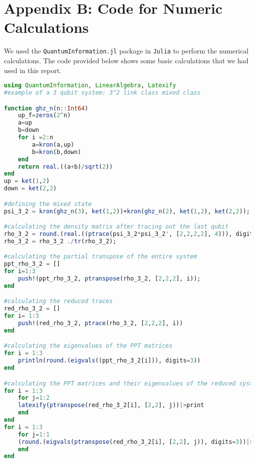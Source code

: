 \documentclass{scrartcl}
\begin{document}
\section*{Appendix B: {\huge Code for Numeric Calculations}}
We used the \texttt{QuantumInformation.jl} package in \texttt{Julia} to perform the numerical calculations. The code provided below shows some basic calculations that we had used in this report. 
\begin{lstlisting}[language=Julia,label={lst:transmission}]
using QuantumInformation, LinearAlgebra, Latexify 
#example of a 3 qubit system: 3^2 link class mixed class

function ghz_n(n::Int64)
    up_f=zeros(2^n)
    a=up
    b=down
    for i =2:n 
        a=kron(a,up)
        b=kron(b,down)
    end
    return real.((a+b)/sqrt(2))
end
up = ket(1,2)
down = ket(2,2)

#defining the mixed state 
psi_3_2 = kron(ghz_n(3), ket(1,2))+kron(ghz_n(2), ket(1,2), ket(2,2));

#calculating the density matrix after tracing out the last qubit
rho_3_2 = round.(real.((ptrace(psi_3_2*psi_3_2', [2,2,2,2], 4))), digits=3) 
rho_3_2 = rho_3_2 ./tr(rho_3_2);

#calculating the partial transpose of the entire system
ppt_rho_3_2 = []
for i=1:3
    push!(ppt_rho_3_2, ptranspose(rho_3_2, [2,2,2], i));
end

#calculating the reduced traces 
red_rho_3_2 = []
for i= 1:3
    push!(red_rho_3_2, ptrace(rho_3_2, [2,2,2], i))
end

#calculating the eigenvalues of the PPT matrices
for i = 1:3
    println(round.(eigvals((ppt_rho_3_2[i])), digits=3))
end

#calculating the PPT matrices and their eigenvalues of the reduced system
for i = 1:3
    for j=1:2
    latexify(ptranspose(red_rho_3_2[i], [2,2], j))|>print
    end
end
for i = 1:3
    for j=1:1
    (round.(eigvals(ptranspose(red_rho_3_2[i], [2,2], j)), digits=3))|>println
    end
end
\end{lstlisting}

\newpage

\end{document}
